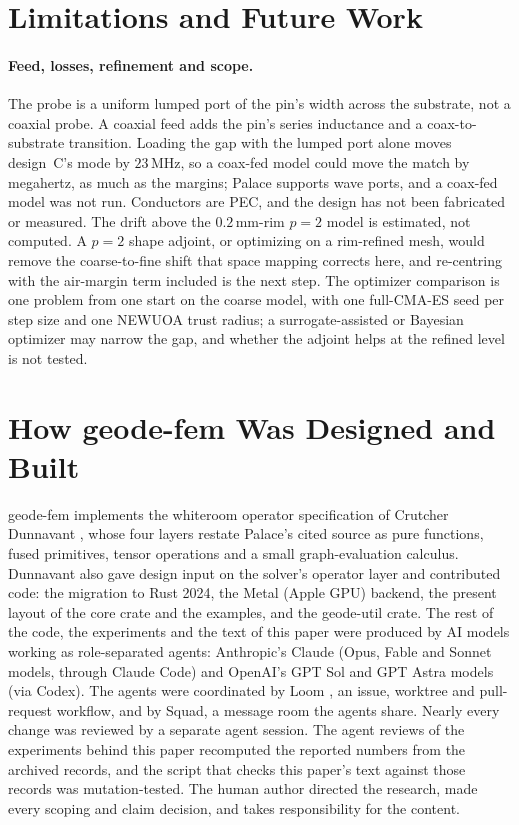 \documentclass{anvil-paper}
\begin{document}
\section{Limitations and Future Work}
\label{sec:limits}

\paragraph{Feed, losses, refinement and scope.}
The probe is a uniform lumped port of the pin's width across the substrate,
not a coaxial probe. A coaxial feed adds the pin's series inductance and a
coax-to-substrate transition. Loading the gap with the lumped port alone
moves design~C's mode by $23$\,MHz, so a coax-fed model could move the
match by megahertz, as much as the margins; Palace supports wave ports, and
a coax-fed model was not run. Conductors are PEC, and the design has not
been fabricated or measured.
The drift above the $0.2$\,mm-rim $p = 2$ model is estimated, not computed.
A $p = 2$ shape adjoint, or optimizing on a rim-refined mesh, would remove
the coarse-to-fine shift that space mapping corrects here, and re-centring
with the air-margin term included is the next step. The optimizer
comparison is one problem from one start on the coarse model, with one
full-CMA-ES seed per step size and one NEWUOA trust radius; a
surrogate-assisted or Bayesian optimizer may narrow the gap, and whether the
adjoint helps at the refined level is not tested.

\section{How geode-fem Was Designed and Built}
\label{sec:built}

geode-fem implements the whiteroom operator specification of Crutcher
Dunnavant \citep{dunnavant2026whiteroom}, whose four layers restate Palace's
cited source as pure functions, fused primitives, tensor operations and a
small graph-evaluation calculus. Dunnavant also gave design input on the
solver's operator layer and contributed code: the migration to Rust 2024, the
Metal (Apple GPU) backend, the present layout of the core crate and the
examples, and the geode-util crate. The rest of the code, the experiments and
the text of this paper were produced by AI models working as role-separated
agents: Anthropic's Claude (Opus, Fable and Sonnet models, through Claude
Code) and OpenAI's GPT Sol and GPT Astra models (via Codex). The agents were
coordinated by Loom \citep{loom}, an issue, worktree and pull-request
workflow, and by Squad, a message room the agents share. Nearly every
change was reviewed by a separate agent session. The agent reviews of the
experiments behind this paper recomputed the reported numbers from the
archived records, and the script that checks this paper's text against
those records was mutation-tested. The human author directed the research,
made every scoping and claim decision, and takes responsibility for the
content.
\end{document}
